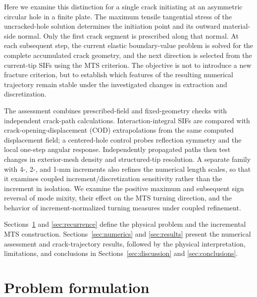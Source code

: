 \documentclass[11pt]{article}
\begin{document}
Here we examine this distinction for a single crack initiating
at an asymmetric circular hole in a finite plate. The maximum
tensile tangential stress of the uncracked-hole solution determines
the initiation point and its outward material-side normal.
Only the first crack segment is prescribed along that normal.
At each subsequent step, the current elastic boundary-value
problem is solved for the complete accumulated crack geometry,
and the next direction is selected from the current-tip SIFs
using the MTS criterion. The objective is not to introduce a
new fracture criterion, but to establish which features of the
resulting numerical trajectory remain stable under the
investigated changes in extraction and discretization.

The assessment combines prescribed-field and fixed-geometry
checks with independent crack-path calculations. Interaction-integral
SIFs are compared with crack-opening-displacement (COD)
extrapolations from the same computed displacement field; a
centered-hole control probes reflection symmetry and the local
one-step angular response. Independently propagated paths
then test changes in exterior-mesh density and structured-tip
resolution. A separate family with 4-, 2-, and 1-mm increments
also refines the numerical length scales, so that it examines
coupled increment/discretization sensitivity rather than the
increment in isolation. We examine the positive maximum and subsequent sign reversal
of mode mixity, their effect on the MTS turning direction,
and the behavior of increment-normalized turning measures
under coupled refinement.

Sections~\ref{sec:problem} and \ref{sec:recurrence} define the
physical problem and the incremental MTS construction.
Sections~\ref{sec:numerics} and \ref{sec:results} present the
numerical assessment and crack-trajectory results, followed
by the physical interpretation, limitations, and conclusions
in Sections~\ref{sec:discussion} and \ref{sec:conclusions}.

\section{Problem formulation}
\label{sec:problem}
\end{document}
